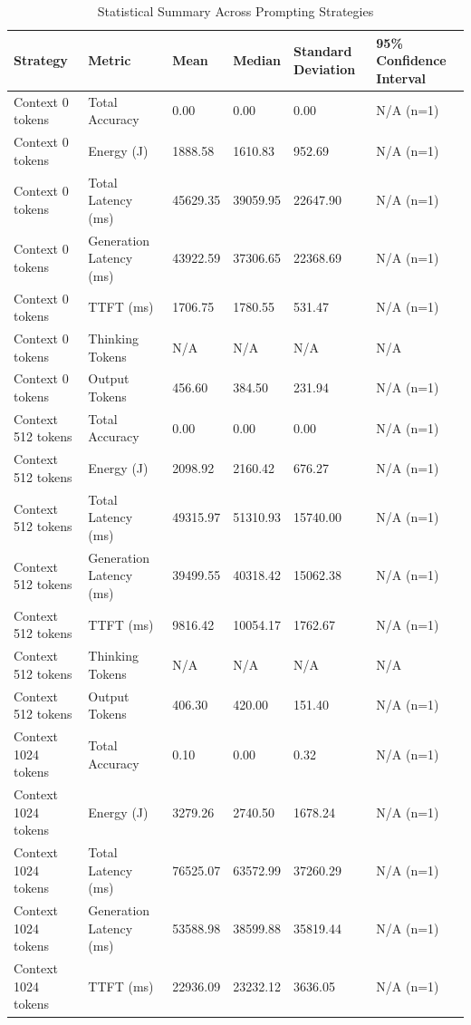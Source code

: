 \begin{table}
\caption{Statistical Summary Across Prompting Strategies}
\label{tab:statistical_summary}
\begin{tabular}{llllll}
\toprule
Strategy & Metric & Mean & Median & Standard Deviation & 95\% Confidence Interval \\
\midrule
Context 0 tokens & Total Accuracy & 0.00 & 0.00 & 0.00 & N/A (n=1) \\
Context 0 tokens & Energy (J) & 1888.58 & 1610.83 & 952.69 & N/A (n=1) \\
Context 0 tokens & Total Latency (ms) & 45629.35 & 39059.95 & 22647.90 & N/A (n=1) \\
Context 0 tokens & Generation Latency (ms) & 43922.59 & 37306.65 & 22368.69 & N/A (n=1) \\
Context 0 tokens & TTFT (ms) & 1706.75 & 1780.55 & 531.47 & N/A (n=1) \\
Context 0 tokens & Thinking Tokens & N/A & N/A & N/A & N/A \\
Context 0 tokens & Output Tokens & 456.60 & 384.50 & 231.94 & N/A (n=1) \\
Context 512 tokens & Total Accuracy & 0.00 & 0.00 & 0.00 & N/A (n=1) \\
Context 512 tokens & Energy (J) & 2098.92 & 2160.42 & 676.27 & N/A (n=1) \\
Context 512 tokens & Total Latency (ms) & 49315.97 & 51310.93 & 15740.00 & N/A (n=1) \\
Context 512 tokens & Generation Latency (ms) & 39499.55 & 40318.42 & 15062.38 & N/A (n=1) \\
Context 512 tokens & TTFT (ms) & 9816.42 & 10054.17 & 1762.67 & N/A (n=1) \\
Context 512 tokens & Thinking Tokens & N/A & N/A & N/A & N/A \\
Context 512 tokens & Output Tokens & 406.30 & 420.00 & 151.40 & N/A (n=1) \\
Context 1024 tokens & Total Accuracy & 0.10 & 0.00 & 0.32 & N/A (n=1) \\
Context 1024 tokens & Energy (J) & 3279.26 & 2740.50 & 1678.24 & N/A (n=1) \\
Context 1024 tokens & Total Latency (ms) & 76525.07 & 63572.99 & 37260.29 & N/A (n=1) \\
Context 1024 tokens & Generation Latency (ms) & 53588.98 & 38599.88 & 35819.44 & N/A (n=1) \\
Context 1024 tokens & TTFT (ms) & 22936.09 & 23232.12 & 3636.05 & N/A (n=1) \\

\end{tabular}
\end{table}
